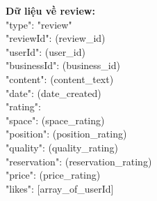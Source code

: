 \documentclass[12pt]{extarticle}
\begin{document}
			\par \textbf{Dữ liệu về review:}\\
				"type": "review"\\
				"reviewId": (review\_id)\\
				"userId": (user\_id)\\
				"businessId": (business\_id)\\
				"content": (content\_text)\\
				"date": (date\_created)\\
				"rating":\\
				\hspace*{1.5cm}"space": (space\_rating)\\
				\hspace*{1.5cm}"position": (position\_rating)\\
				\hspace*{1.5cm}"quality": (quality\_rating)\\
				\hspace*{1.5cm}"reservation": (reservation\_rating)\\
				\hspace*{1.5cm}"price": (price\_rating)\\		
				"likes": [array\_of\_userId]
					
\end{document}

